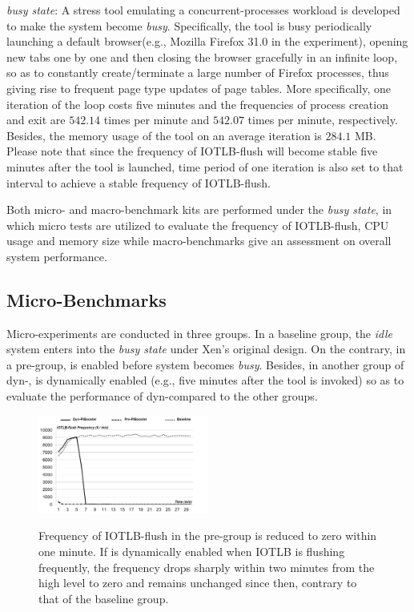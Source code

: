 \emph{busy state}: A stress tool emulating a concurrent-processes workload is developed to make the system become \emph{busy}. Specifically, the tool is busy periodically launching a default browser(e.g., Mozilla Firefox 31.0 in the experiment), opening new tabs one by one and then closing the browser gracefully in an infinite loop, so as to constantly create/terminate a large number of Firefox processes, thus giving rise to frequent page type updates of page tables. More specifically, one iteration of the loop costs five minutes and the frequencies of process creation and exit are $542.14$ times per minute and $542.07$ times per minute, respectively. Besides, the memory usage of the tool on an average iteration is $284.1$ MB. Please note that since the frequency of IOTLB-flush will become stable five minutes after the tool is launched, time period of one iteration is also set to that interval to achieve a stable frequency of IOTLB-flush.

Both micro- and macro-benchmark kits are performed under the \emph{busy state}, in which micro tests are utilized to evaluate the frequency of IOTLB-flush, CPU usage and memory size while macro-benchmarks give an assessment on overall system performance.

\subsection{Micro-Benchmarks}

Micro-experiments are conducted in three groups. In a baseline group, the \emph{idle} system enters into the \emph{busy state} under Xen's original design. On the contrary, in a pre-\name group, \name is enabled before system becomes \emph{busy}. Besides, in another group of dyn-\name, \name is dynamically enabled (e.g., five minutes after the tool is invoked) so as to evaluate the performance of dyn-\name compared to the other groups.

\begin{figure}[ht]
\centering
\includegraphics[width=0.5\textwidth]{image/micro/iotlbflush.jpg} \\
\caption{Frequency of IOTLB-flush in the pre-\name group is reduced to zero within one minute. If \name is dynamically enabled when IOTLB is flushing frequently, the frequency drops sharply within two minutes from the high level to zero and remains unchanged since then, contrary to that of the baseline group.}
\label{fig:iotlbflush}
\end{figure}

